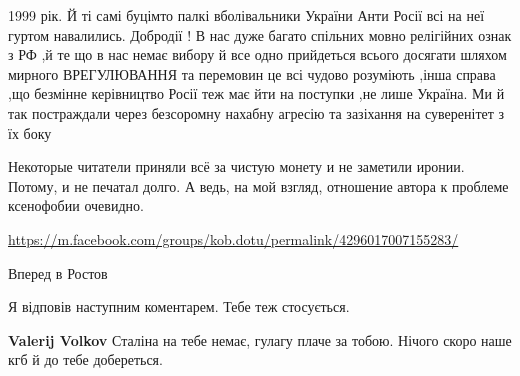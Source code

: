 \begin{itemize}
1999 рік. Й ті самі буцімто палкі вболівальники України Анти Росії всі на неї
гуртом навалились. Добродії ! В нас дуже багато спільних мовно релігійних ознак
з РФ ,й те що в нас немає вибору й все одно прийдеться всього досягати шляхом
мирного ВРЕГУЛЮВАННЯ та перемовин це всі чудово розуміють ,інша справа ,що
безмінне керівництво Росії теж має йти на поступки ,не лише Україна. Ми й так
постраждали через безсоромну нахабну агресію та зазіхання на суверенітет з їх
боку

 

Некоторые читатели приняли всё за чистую монету и не заметили иронии. Потому, и
не печатал долго. А ведь, на мой взгляд, отношение автора к проблеме ксенофобии
очевидно.


 

\url{https://m.facebook.com/groups/kob.dotu/permalink/4296017007155283/}

 
Вперед в Ростов

\begin{itemize}
 
Я відповів наступним коментарем.
Тебе теж стосується.

 
\textbf{Valerij Volkov} Сталіна на тебе немає, гулагу плаче за тобою. Нічого скоро наше кгб й до тебе добереться.


\end{itemize}
\end{itemize}
